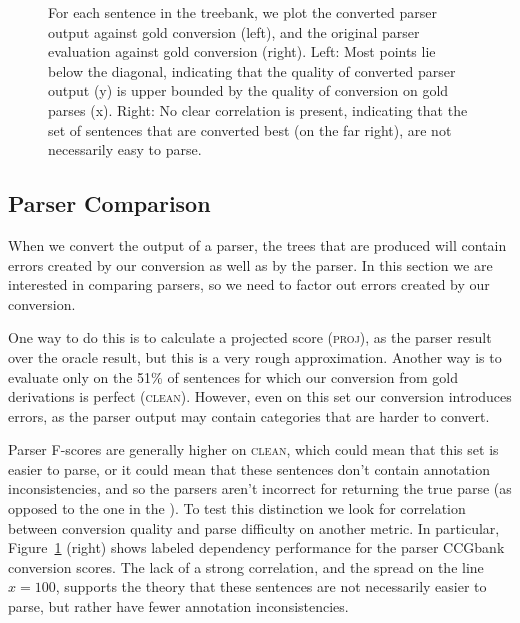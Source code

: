 \begin{figure}
	\hspace{-1.4cm}
	\scalebox{0.8}{
	
	\hspace{-2.9cm}
	
	}
	\caption{
		\label{fig:scatter_plots}
		For each sentence in the treebank, we plot the converted parser output
		against gold conversion (left), and the original parser evaluation against
		gold conversion (right).
		Left: Most points lie below the diagonal, indicating that the quality of
		converted parser output (y) is upper bounded by the quality of conversion on
		gold parses (x).
		Right: No clear correlation is present, indicating that the set of
		sentences that are converted best (on the far right), are not necessarily
		easy to parse.
	}
\end{figure}

\subsection{Parser Comparison}

When we convert the output of a \ccg parser, the \ptb trees that are produced
will contain errors created by our conversion as well as by the parser. In this
section we are interested in comparing parsers, so we need to factor out errors
created by our conversion.

One way to do this is to calculate a projected score (\textsc{proj}), as the
parser result over the oracle result, but this is a very rough approximation.
Another way is to evaluate only on the 51\% of sentences for which our
conversion from gold \ccg derivations is perfect (\textsc{clean}).  However,
even on this set our conversion introduces errors, as the parser output may
contain categories that are harder to convert.

Parser F-scores are generally higher on \textsc{clean}, which could mean that this
set is easier to parse, or it could mean that these sentences don't contain
annotation inconsistencies, and so the parsers aren't incorrect for returning
the true parse (as opposed to the one in the \ptb).  To test this distinction
we look for correlation between conversion quality and parse difficulty on
another metric.  In particular, Figure~\ref{fig:scatter_plots} (right) shows
\ccg labeled dependency performance for the \candc parser \myvs CCGbank
conversion \parseval scores. The lack of a strong correlation, and the spread
on the line $x=100$, supports the theory that these sentences are not
necessarily easier to parse, but rather have fewer annotation inconsistencies.

